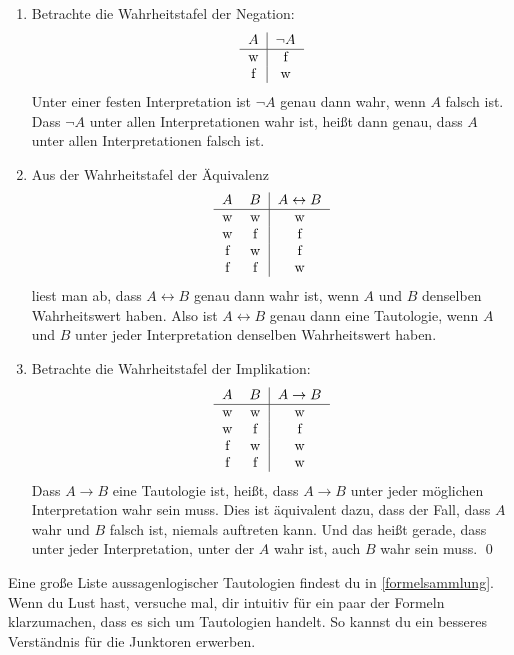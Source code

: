 \begin{bew}
    \begin{enumerate}
        \item Betrachte die Wahrheitstafel der Negation:
        \[\begin{tabular}{c|c}
            $A$ &  $\neg A$ \\
            \hline
            w&f\\
            f&w
        \end{tabular}\]
        Unter einer festen Interpretation ist $\neg A$ genau dann wahr, wenn $A$ falsch ist. Dass $\neg A$ unter allen Interpretationen wahr ist, heißt dann genau, dass $A$ unter allen Interpretationen falsch ist.
        \item Aus der Wahrheitstafel der Äquivalenz
        \[\begin{tabular}{cc|c}
            $A$ &  $B$ & $A \leftrightarrow B$ \\
            \hline
            w&w&w\\
            w&f&f \\
            f & w & f\\
            f & f & w
        \end{tabular}\]
        liest man ab, dass $A\leftrightarrow B$ genau dann wahr ist, wenn $A$ und $B$ denselben Wahrheitswert haben. Also ist $A\leftrightarrow B$ genau dann eine Tautologie, wenn $A$ und $B$ unter jeder Interpretation denselben Wahrheitswert haben.
        \item Betrachte die Wahrheitstafel der Implikation:
        \[\begin{tabular}{cc|c}
            $A$ &  $B$ & $A \to B$ \\
            \hline
            w&w&w\\
            w&f&f \\
            f & w & w\\
            f & f & w
        \end{tabular}\]
        Dass $A\to B$ eine Tautologie ist, heißt, dass $A\to B$ unter jeder möglichen Interpretation wahr sein muss. Dies ist äquivalent dazu, dass der Fall, dass $A$ wahr und $B$ falsch ist, niemals auftreten kann. Und das heißt gerade, dass unter jeder Interpretation, unter der $A$ wahr ist, auch $B$ wahr sein muss. \qed
    \end{enumerate}
\end{bew}
 

\begin{bem}
    Eine große Liste aussagenlogischer Tautologien findest du in \cref{formelsammlung}. Wenn du Lust hast, versuche mal, dir intuitiv für ein paar der Formeln klarzumachen, dass es sich um Tautologien handelt. So kannst du ein besseres Verständnis für die Junktoren erwerben.
\end{bem}


